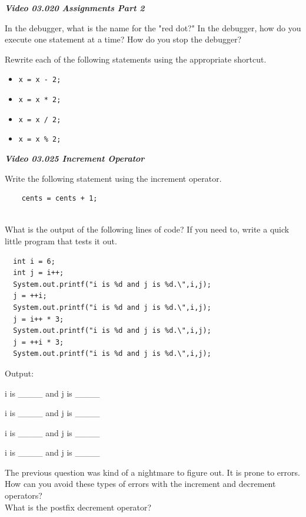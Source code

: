 \documentclass[letterpaper,11pt]{exam}
\newcommand{\videoheading}[1]{\Large\textbf{\textit{#1}}}
\begin{document}
\begin{questions}
\videoheading{Video 03.020 Assignments Part 2}

\question In the debugger, what is the name for the "red dot?"
\question In the debugger, how do you execute one statement at a time?
\question How do you stop the debugger?

\begin{samepage}
  \question Rewrite each of the following statements using the appropriate shortcut.
  \begin{itemize}
    \item \texttt{x = x - 2;}
    \item \texttt{x = x * 2;}
    \item \texttt{x = x / 2;}
    \item \texttt{x = x \% 2;}
  \end{itemize}
  \vspace{0.5cm}
\end{samepage}

\videoheading{Video 03.025 Increment Operator}

\question Write the following statement using the increment operator.

\begin{verbatim}
    cents = cents + 1;


\end{verbatim}

\begin{samepage}
\question What is the output of the following lines of code?  If you need to, write a quick little program that tests it out.
\begin{verbatim}
  int i = 6;
  int j = i++;
  System.out.printf("i is %d and j is %d.\",i,j);
  j = ++i;
  System.out.printf("i is %d and j is %d.\",i,j);
  j = i++ * 3;
  System.out.printf("i is %d and j is %d.\",i,j);
  j = ++i * 3;
  System.out.printf("i is %d and j is %d.\",i,j);
\end{verbatim}

Output:

    i is \_\_\_\_ and j is \_\_\_\_

    i is \_\_\_\_ and j is \_\_\_\_

    i is \_\_\_\_ and j is \_\_\_\_

    i is \_\_\_\_ and j is \_\_\_\_
\end{samepage}
\question
The previous question was kind of a nightmare to figure out.  It is prone to errors.  How can you avoid these types of errors with the increment and decrement operators?
\\
\question What is the postfix decrement operator?


\end{questions}
\end{document}
